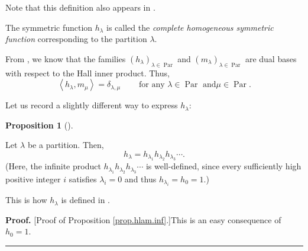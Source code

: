 \documentclass[numbers=enddot,12pt,final,onecolumn,notitlepage]{scrartcl}%
\theoremstyle{definition}
\newtheorem{prop}[theo]{Proposition}
\newenvironment{proposition}[1][]
{\begin{prop}[#1]\begin{leftbar}}
{\end{leftbar}\end{prop}}
\newenvironment{proof}[1][Proof]{\noindent\textbf{#1.} }{\ \rule{0.5em}{0.5em}}
\newenvironment{verlong}{}{}
\newenvironment{vershort}{}{}
\begin{document}
\begin{verlong}
Note that this definition also appears in \cite[Definition 2.2.1]{GriRei}.
\end{verlong}

The symmetric function $h_{\lambda}$ is called the \emph{complete homogeneous
symmetric function} corresponding to the partition $\lambda$.

From \cite[Corollary 2.5.17(a)]{GriRei}, we know that the families $\left(
h_{\lambda}\right)  _{\lambda\in\operatorname*{Par}}$ and $\left(  m_{\lambda
}\right)  _{\lambda\in\operatorname*{Par}}$ are dual bases with respect to the
Hall inner product. Thus,%
\begin{equation}
\left\langle h_{\lambda},m_{\mu}\right\rangle =\delta_{\lambda,\mu
}\ \ \ \ \ \ \ \ \ \ \text{for any }\lambda\in\operatorname*{Par}\text{ and
}\mu\in\operatorname*{Par}. \label{eq.hlam-mlam-dual}%
\end{equation}


Let us record a slightly different way to express $h_{\lambda}$:

\begin{proposition}
\label{prop.hlam.inf}Let $\lambda$ be a partition. Then,%
\[
h_{\lambda}=h_{\lambda_{1}}h_{\lambda_{2}}h_{\lambda_{3}}\cdots.
\]
(Here, the infinite product $h_{\lambda_{1}}h_{\lambda_{2}}h_{\lambda_{3}%
}\cdots$ is well-defined, since every sufficiently high positive integer $i$
satisfies $\lambda_{i}=0$ and thus $h_{\lambda_{i}}=h_{0}=1$.)
\end{proposition}

This is how $h_{\lambda}$ is defined in \cite[Section I.2]{Macdon95}.

\begin{vershort}
\begin{proof}
[Proof of Proposition \ref{prop.hlam.inf}.]This is an easy consequence of
$h_{0}=1$.
\end{proof}
\end{vershort}
\end{document}
